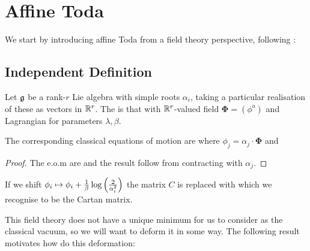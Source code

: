 \documentclass{article}
\begin{document}
\section{Affine Toda}
 We start by introducing affine Toda from a field theory perspective, following \cite{Braden1990}:
 
\subsection{Independent Definition}
 
\begin{definition}
	Let $\mathfrak{g}$ be a rank-$r$ Lie algebra with simple roots $\alpha_i$, taking a particular realisation of these as vectors in $\mathbb{R}^r$. The  is that with $\mathbb{R}^r$-valued field $\bm{\Phi} = (\phi^a)$ and Lagrangian 
for parameters $\lambda,\beta$.
\end{definition}

\begin{prop}
	The corresponding classical equations of motion are 
where $\phi_j = \alpha_j \cdot \bm{\Phi}$ and 
\end{prop}
\begin{proof}
	The e.o.m are 
and the result follow from contracting with $\alpha_j$.
\end{proof}

\begin{remark}
	If we shift $\phi_i \mapsto \phi_i + \frac{1}{\beta}\log \left( \frac{2}{\alpha_i^2} \right)$ the matrix $C$ is replaced with 
which we recognise to be the Cartan matrix. 
\end{remark}

This field theory does not have a unique minimum for us to consider as the classical vacuum, so we will want to deform it in some way. The following result motivates how do this deformation:
\end{document}
